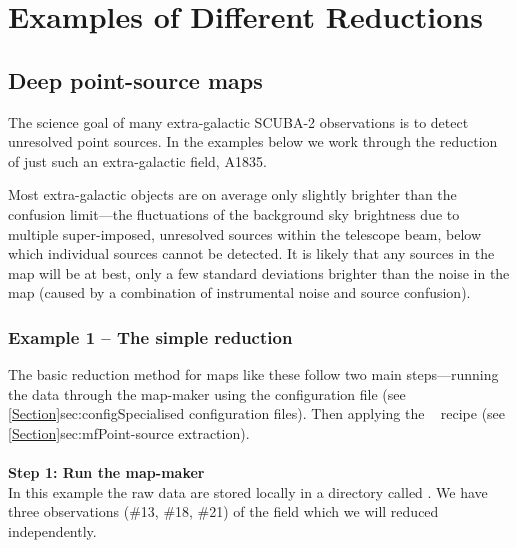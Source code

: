 \chapter{Examples of Different Reductions}
\label{sec:eg}

\section{Deep point-source maps}
\label{sec:cosmology}

The science goal of many extra-galactic SCUBA-2 observations is to
detect unresolved point sources. In the examples below we work through the
reduction of just such an extra-galactic field, A1835.

Most extra-galactic objects are on average only slightly brighter than
the confusion limit---the fluctuations of the background sky
brightness due to multiple super-imposed, unresolved sources within
the telescope beam, below which individual sources cannot be detected.
It is likely that any sources in the map will be at best, only a few
standard deviations brighter than the noise in the map (caused by a
combination of instrumental noise and source confusion).

\subsection{Example 1 -- The simple reduction}
The basic reduction method for maps like these follow two main
steps---running the data through the map-maker using the
 configuration file (see
\cref{Section}{sec:config}{Specialised configuration files}). Then
applying the \picard\  recipe (see
\cref{Section}{sec:mf}{Point-source extraction}).
\\ \\
\textbf{Step 1: Run the map-maker}\\
In this example the raw data are stored locally in a directory called
. We have three observations (\#13, \#18, \#21) of the field
which we will reduced independently.


